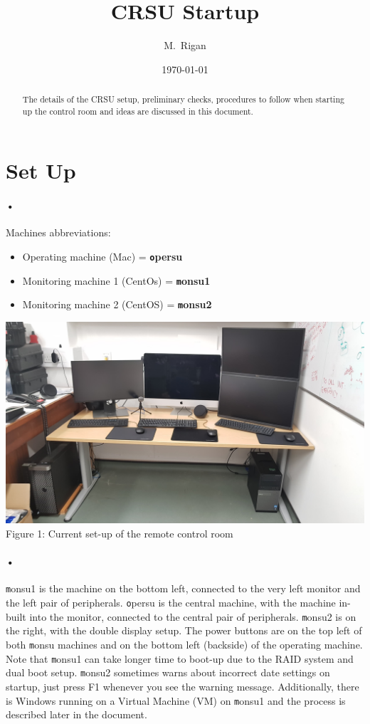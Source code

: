 \documentclass[12pt, oneside, a4paper]{article}
\title{CRSU Startup}
\author{M.\ Rigan}
\affil{MPS, University of Sussex}
\date{\today}
\begin{document}
\maketitle
\begin{abstract}
		The details of the CRSU setup, preliminary checks, procedures to follow when starting up the control room and ideas are discussed in this document.
\end{abstract}
\clearpage
\tableofcontents
\clearpage

\section{Set Up}
\paragraph{•}
Machines abbreviations:
\begin{itemize}
	\item Operating machine (Mac) = \textbf{\texttt opersu}
	\item Monitoring machine 1 (CentOs) = \textbf{\texttt monsu1 }
	\item Monitoring machine 2 (CentOS) = \textbf{\texttt monsu2}
\end{itemize}
\begin{center}
\includegraphics[width=1\textwidth]{figures/set_up.jpg} Figure 1: Current set-up of the remote control room
\end{center}
\paragraph{•}
{\texttt monsu1} is the machine on the bottom left, connected to the very left monitor and the left pair of peripherals. {\texttt opersu} is the central machine, with the machine in-built into the monitor, connected to the central pair of peripherals. {\texttt monsu2} is on the right, with the double display setup. The power buttons are on the top left of both {\texttt monsu} machines and on the bottom left (backside) of the operating machine. Note that {\texttt monsu1} can take longer time to boot-up due to the RAID system and dual boot setup. {\texttt monsu2 }sometimes warns about incorrect date settings on startup, just press F1 whenever you see the warning message. Additionally, there is Windows running on a Virtual Machine (VM) on {\texttt monsu1} and the process is described later in the document.
\end{document}
